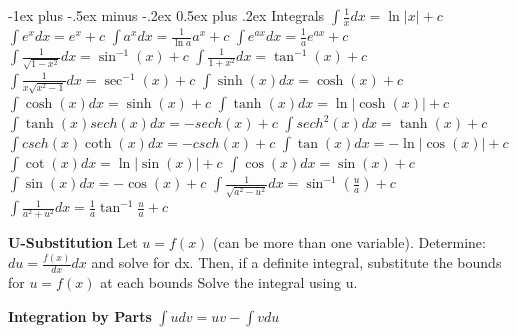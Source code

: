 \documentclass[10pt,landscape]{article}
\makeatletter
\renewcommand{\section}{\@startsection{section}{1}{0mm}%
                                {-1ex plus -.5ex minus -.2ex}%
                                {0.5ex plus .2ex}%
                                {\normalfont\large\bfseries}}
\makeatother
\begin{document}
\begin{multicols*}{5}
\section{Integrals}
\scriptsize
$\int \frac{1}{x}dx = \ln|x|+c$\newline
$\int e^x dx = e^x+c $\newline
$\int a^x dx = \frac{1}{\ln a} a^x+c $\newline
$\int e^{ax} dx = \frac{1}{a} e^{ax}+c $\newline
$\int \frac{1}{\sqrt{1-x^2}} dx = \sin^{-1}(x)+c $\newline
$\int \frac{1}{1+x^2} dx = \tan^{-1}(x)+c $\newline
$\int \frac{1}{x\sqrt{x^2-1}} dx = \sec^{-1}(x)+c $\newline
$\int \sinh(x) dx = \cosh(x)+c $\newline
$\int \cosh(x) dx = \sinh(x)+c $\newline
$\int \tanh(x) dx = \ln|\cosh(x)|+c $\newline
$\int \tanh(x)sech(x) dx = -sech(x)+c $\newline
$\int sech^2(x) dx = \tanh(x)+c $\newline
$\int csch(x)\coth(x) dx = -csch(x)+c $\newline
$\int \tan(x) dx = -\ln|\cos(x) |+c $\newline
$\int \cot(x) dx = \ln|\sin(x)|+c $\newline
$\int \cos(x) dx = \sin(x)+c $\newline
$\int \sin(x) dx = -\cos(x)+c $\newline
$\int \frac{1}{\sqrt{a^2-u^2}} dx = \sin^{-1}(\frac{u}{a})+c $\newline
$\int \frac{1}{a^2+u^2} dx = \frac{1}{a}\tan^{-1}\frac{u}{a}+c $\newline

\textbf{U-Substitution}\newline
Let $ u=f(x) $ (can be more than one variable).\newline
Determine: $ du = \frac{f(x)}{dx}dx $ and solve for dx.\newline
Then, if a definite integral, substitute the bounds for $ u=f(x) $ at each bounds\newline
Solve the integral using u.\newline

\textbf{Integration by Parts}\newline
$ \int u dv = uv-\int v du $


\end{multicols*}
\end{document}
